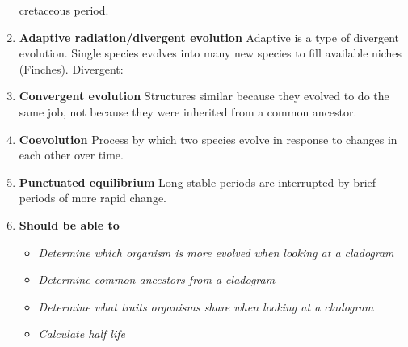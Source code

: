 \documentclass[9pt]{article}
\begin{document}
\begin{enumerate}
    cretaceous period.
  \item {\bf Adaptive radiation/divergent evolution} Adaptive is a
    type of divergent evolution. Single species evolves into many
    new species to fill available niches (Finches). Divergent:
  \item {\bf Convergent evolution} Structures similar because they
    evolved to do the same job, not because they were inherited from a
    common ancestor.
  \item {\bf Coevolution} Process by which two species evolve in
    response to changes in each other over time.
  \item {\bf Punctuated equilibrium} Long stable periods are
    interrupted by brief periods of more rapid change.
  \item {\bf Should be able to}
    \begin{itemize}
      \item {\em Determine which organism is more evolved when looking at a cladogram}
      \item {\em Determine common ancestors from a cladogram}
      \item {\em Determine what traits organisms share when looking at a cladogram}
      \item {\em Calculate half life}
    \end{itemize}
\end{enumerate}
\end{document}
